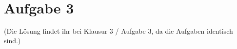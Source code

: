 \section*{Aufgabe 3}

(Die Lösung findet ihr bei Klausur 3 / Aufgabe 3, da die Aufgaben identisch sind.)

